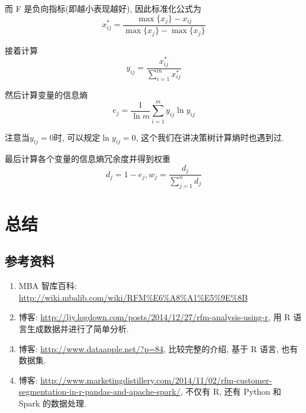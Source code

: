 \documentclass[a4paper,UTF8]{ctexart}
\theoremstyle{plain} \newtheorem{theorem}{定理}[section]
\theoremstyle{plain} \newtheorem{definition}{定义}[section]
\theoremstyle{plain} \newtheorem{lemma}{引理}[section]
\theoremstyle{plain} \newtheorem{proposition}{命题}[section]
\theoremstyle{plain} \newtheorem{example}{例}[section]
\theoremstyle{plain} \newtheorem{remark}{注}[section]
\theoremstyle{plain} \newtheorem{corollary}{推论}[section]
\begin{document}
而 F 是负向指标(即越小表现越好), 因此标准化公式为
\begin{equation*}
x_{ij}^{*} = \frac{\max \{x_j\} - x_{ij}}{\max \{x_j\} - \max \{x_j\}}
\end{equation*}

接着计算
\begin{equation*}
y_{ij} = \frac{x_{ij}^{*}}{\sum\limits_{i=1}^{m} x_{ij}^{*}}
\end{equation*}

然后计算变量的信息熵
\begin{equation*}
e_{j} = \frac{1}{\ln m} \sum_{i=1}^{m} y_{ij} \ln y_{ij}
\end{equation*}

注意当$y_{ij} = 0$时, 可以规定$\ln y_{ij} = 0$, 这个我们在讲决策树计算熵时也遇到过.

最后计算各个变量的信息熵冗余度并得到权重
\begin{equation*}
d_{j} = 1 - e_{j}, w_{j} = \frac{d_{j}}{\sum\limits_{j=1}^{n} d_{j}}
\end{equation*}



\section{总结}
\subsection{参考资料}
\begin{enumerate}[(1)]
\item MBA 智库百科: \url{http://wiki.mbalib.com/wiki/RFM%E6%A8%A1%E5%9E%8B}

\item 博客: \url{http://ljy.logdown.com/posts/2014/12/27/rfm-analysis-using-r}, 用 R 语言生成数据并进行了简单分析.

\item 博客: \url{http://www.dataapple.net/?p=84}, 比较完整的介绍, 基于 R 语言, 也有数据集.

\item 博客: \url{http://www.marketingdistillery.com/2014/11/02/rfm-customer-segmentation-in-r-pandas-and-apache-spark/}, 不仅有 R, 还有 Python 和 Spark 的数据处理.
\end{enumerate}
\end{document}
